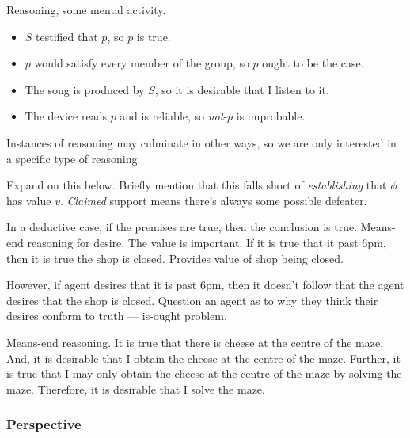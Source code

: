 \begin{note}
  Reasoning, some mental activity.
\end{note}

\begin{note}
  \begin{itemize}
  \item \(S\) testified that \(p\), so \(p\) is true.
  \item \(p\) would satisfy every member of the group, so \(p\) ought to be the case.
  \item The song is produced by \(S\), so it is desirable that I listen to it.
  \item The device reads \(p\) and is reliable, so \emph{not}-\(p\) is improbable.
  \end{itemize}
\end{note}

\begin{note}
  Instances of reasoning may culminate in other ways, so we are only interested in a specific type of reasoning.
\end{note}

\begin{note}
  Expand on this below.
  Briefly mention that this falls short of \emph{establishing} that \(\phi\) has value \(v\).
  \emph{Claimed} support means there's always some possible defeater.
\end{note}

\begin{note}
  In a deductive case, if the premises are true, then the conclusion is true.
  Means-end reasoning for desire.
  The value is important.
  If it is true that it past 6pm, then it is true the shop is closed.
  Provides value of shop being closed.

  However, if agent desires that it is past 6pm, then it doesn't follow that the agent desires that the shop is closed.
  Question an agent as to why they think their desires conform to truth --- is-ought problem.

  Means-end reasoning.
  It is true that there is cheese at the centre of the maze.
  And, it is desirable that I obtain the cheese at the centre of the maze.
  Further, it is true that I may only obtain the cheese at the centre of the maze by solving the maze.
  Therefore, it is desirable that I solve the maze.
\end{note}

\subsubsection{Perspective}
\label{sec:no-closure}

